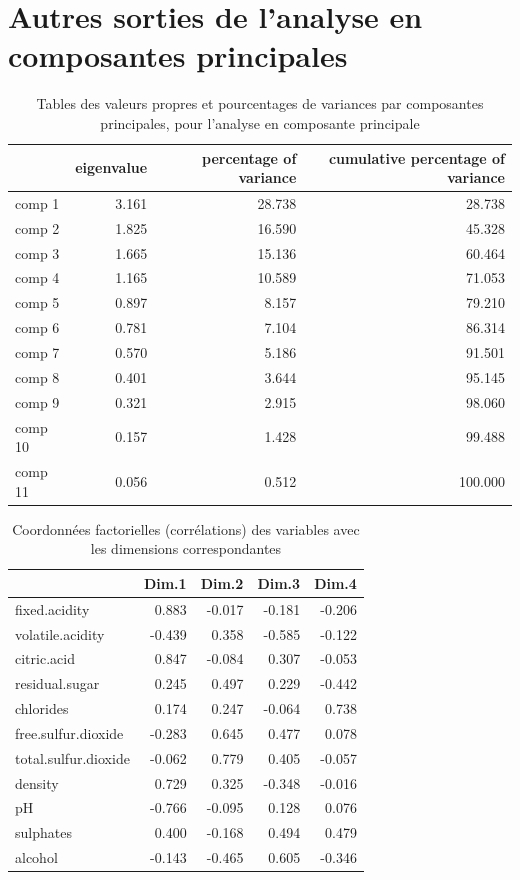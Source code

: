 \documentclass[11pt,a4paper]{article}
\begin{document}
\section{Autres sorties de l'analyse en composantes principales}
\label{sec:eigpca}
\begin{table}[h]
	\centering
	\begin{tabular}{lrrr}
		\hline
		& eigenvalue & percentage of variance & cumulative percentage of variance \\ 
		\hline
		comp 1 & 3.161 & 28.738 & 28.738 \\ 
		comp 2 & 1.825 & 16.590 & 45.328 \\ 
		comp 3 & 1.665 & 15.136 & 60.464 \\ 
		comp 4 & 1.165 & 10.589 & 71.053 \\ 
		comp 5 & 0.897 & 8.157 & 79.210 \\ 
		comp 6 & 0.781 & 7.104 & 86.314 \\ 
		comp 7 & 0.570 & 5.186 & 91.501 \\ 
		comp 8 & 0.401 & 3.644 & 95.145 \\ 
		comp 9 & 0.321 & 2.915 & 98.060 \\ 
		comp 10 & 0.157 & 1.428 & 99.488 \\ 
		comp 11 & 0.056 & 0.512 & 100.000 \\ 
		\hline
	\end{tabular}
	\caption{Tables des valeurs propres et pourcentages de variances par composantes principales, pour l'analyse en composante principale}
	\label{table:eigpca}
\end{table}
\begin{table}[h]
	\centering
	\begin{tabular}{lrrrr}
		\hline
		& Dim.1 & Dim.2 & Dim.3 & Dim.4 \\ 
		\hline
		fixed.acidity & 0.883 & -0.017 & -0.181 & -0.206 \\ 
		volatile.acidity & -0.439 & 0.358 & -0.585 & -0.122 \\ 
		citric.acid & 0.847 & -0.084 & 0.307 & -0.053 \\ 
		residual.sugar & 0.245 & 0.497 & 0.229 & -0.442 \\ 
		chlorides & 0.174 & 0.247 & -0.064 & 0.738 \\ 
		free.sulfur.dioxide & -0.283 & 0.645 & 0.477 & 0.078 \\ 
		total.sulfur.dioxide & -0.062 & 0.779 & 0.405 & -0.057 \\ 
		density & 0.729 & 0.325 & -0.348 & -0.016 \\ 
		pH & -0.766 & -0.095 & 0.128 & 0.076 \\ 
		sulphates & 0.400 & -0.168 & 0.494 & 0.479 \\ 
		alcohol & -0.143 & -0.465 & 0.605 & -0.346 \\ 
		\hline
	\end{tabular}

\caption{Coordonnées factorielles (corrélations) des variables avec les dimensions correspondantes}
\label{table:corpca}
\end{table}
\end{document}
